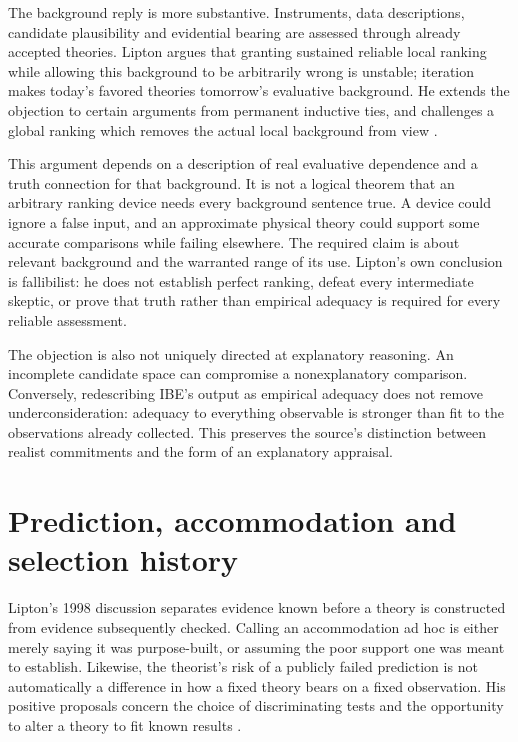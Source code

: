 The background reply is more substantive. Instruments, data descriptions,
candidate plausibility and evidential bearing are assessed through already
accepted theories. Lipton argues that granting sustained reliable local
ranking while allowing this background to be arbitrarily wrong is unstable;
iteration makes today's favored theories tomorrow's evaluative background.
He extends the objection to certain arguments from permanent inductive ties,
and challenges a global ranking which removes the actual local background
from view \cite[secs.~V--VII]{Lipton1993BestGoodEnough}.

This argument depends on a description of real evaluative dependence and a
truth connection for that background. It is not a logical theorem that an
arbitrary ranking device needs every background sentence true. A device
could ignore a false input, and an approximate physical theory could support
some accurate comparisons while failing elsewhere. The required claim is
about relevant background and the warranted range of its use. Lipton's
own conclusion is fallibilist: he does not establish perfect ranking,
defeat every intermediate skeptic, or prove that truth rather than empirical
adequacy is required for every reliable assessment.

The objection is also not uniquely directed at explanatory reasoning.
An incomplete candidate space can compromise a nonexplanatory comparison.
Conversely, redescribing IBE's output as empirical adequacy does not remove
underconsideration: adequacy to everything observable is stronger than fit
to the observations already collected. This preserves the source's distinction
between realist commitments and the form of an explanatory appraisal.

\section{Prediction, accommodation and selection history}
\label{sec:p16-ibe-prediction}

Lipton's 1998 discussion separates evidence known before a theory is
constructed from evidence subsequently checked. Calling an accommodation
ad hoc is either merely saying it was purpose-built, or assuming the poor
support one was meant to establish. Likewise, the theorist's risk of a
publicly failed prediction is not automatically a difference in how a fixed
theory bears on a fixed observation. His positive proposals concern the
choice of discriminating tests and the opportunity to alter a theory to fit
known results \cite[author copy pp.~10--15]{Lipton1998CambridgeContributions}.

